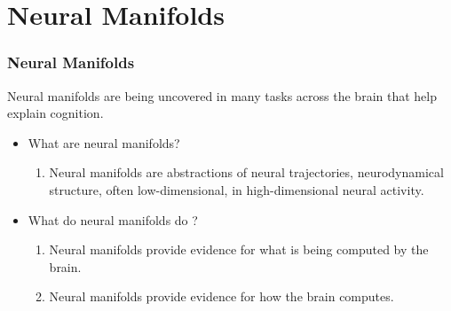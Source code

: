 \documentclass{beamer}
\begin{document}
\section{Neural Manifolds}
\begin{frame}
\frametitle{\textbf{Neural Manifolds} }
Neural manifolds are being uncovered in many tasks across the brain that help explain cognition.

\begin{itemize}
    \item What are neural manifolds?
    \begin{enumerate}
        \item Neural manifolds are abstractions of neural trajectories, neurodynamical structure, often low-dimensional, in high-dimensional neural activity.
    \end{enumerate}
    \item What do neural manifolds do ?
    \begin{enumerate}
        \item Neural manifolds provide evidence for what is being computed by the brain.
        \item Neural manifolds provide evidence for how the brain computes.
    \end{enumerate}
\end{itemize}


\end{frame}

\end{document}
